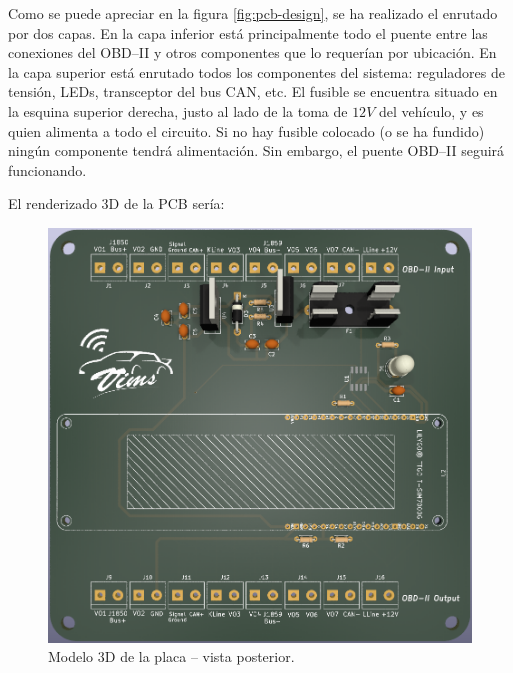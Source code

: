 Como se puede apreciar en la figura \ref{fig:pcb-design}, se ha realizado el enrutado
por dos capas. En la capa inferior está principalmente todo el puente entre las
conexiones del \ac{OBD}--II y otros componentes que lo requerían por ubicación. En
la capa superior está enrutado todos los componentes del sistema: reguladores de
tensión, LEDs, transceptor del bus \ac{CAN}, etc. El fusible se encuentra situado
en la esquina superior derecha, justo al lado de la toma de $12V$ del vehículo,
y es quien alimenta a todo el circuito. Si no hay fusible colocado (o se ha fundido)
ningún componente tendrá alimentación. Sin embargo, el puente \ac{OBD}--II seguirá
funcionando.

El renderizado 3D de la PCB sería:

\begin{figure}[H]
  \centering
  \begin{minipage}{.48\linewidth}
    \includegraphics[width=\linewidth]{images/pcb-3d-front.png}
    \caption{Modelo 3D de la placa -- vista posterior.}
    \label{fig:3d-pcb-front}
  \end{minipage}\hfill
  \begin{minipage}{.48\linewidth}

\end{minipage}
\end{figure}
